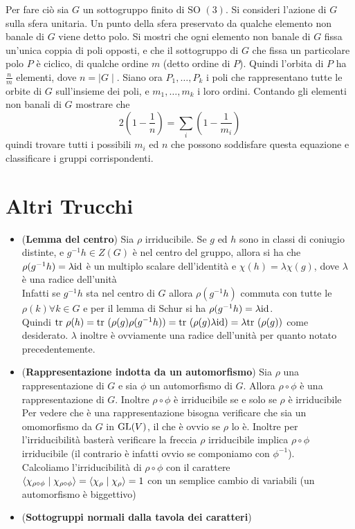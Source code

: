 \documentclass[a4paper,NoNotes,GeneralMath]{stdmdoc}
\newcommand{\SO}{\text{SO }}
\begin{document}
	Per fare ciò sia $G$ un sottogruppo finito di $\SO(3)$. Si consideri l'azione di $G$ sulla sfera unitaria. Un punto della sfera preservato da qualche elemento non banale di $G$ viene detto polo. Si mostri che ogni elemento non banale di $G$ fissa un'unica coppia di poli opposti, e che il sottogruppo di $G$ che fissa un particolare polo $P$ è ciclico, di qualche ordine $m$ (detto ordine di $P$). Quindi l'orbita di $P$ ha $\frac{n}{m}$ elementi, dove $n = \mid G \mid$. Siano ora $P_1, \ldots, P_k$ i poli che rappresentano tutte le orbite di $G$ sull'insieme dei poli, e $m_1, \ldots, m_k$ i loro ordini. Contando gli elementi non banali di $G$ mostrare che $$ 2 \left( 1 - \frac{1}{n} \right) = \sum_i \left( 1 - \frac{1}{m_i} \right) $$ quindi trovare tutti i possibili $m_i$ ed $n$ che possono soddisfare questa equazione e classificare i gruppi corrispondenti.

	\section{Altri Trucchi}
	\begin{itemize}
		\item ({\bf Lemma del centro}) Sia $\rho$ irriducibile. Se $g$ ed $h$ sono in classi di coniugio distinte, e $g^{-1}h \in Z(G)$ è nel centro del gruppo, allora si ha che $\rho(g^{-1}h) = \lambda \mbox{id}$ è un multiplo scalare dell'identità e $\chi(h) = \lambda \chi(g)$, dove $\lambda$ è una radice dell'unità \\
		Infatti se $g^{-1}h$ sta nel centro di $G$ allora $\rho(g^{-1}h)$ commuta con tutte le $\rho(k) \forall k \in G$ e per il lemma di Schur si ha $\rho(g^{-1}h) = \lambda \mbox{id}$. \\
		Quindi $\mbox{tr } \rho(h) = \mbox{tr } ( \rho(g) \rho(g^{-1}h) ) = \mbox{tr } ( \rho(g) \lambda \mbox{id}) = \lambda \mbox{tr }(\rho(g))$ come desiderato.
		$\lambda$ inoltre è ovviamente una radice dell'unità per quanto notato precedentemente.

		\item ({\bf Rappresentazione indotta da un automorfismo}) Sia $\rho$ una rappresentazione di $G$ e sia $\phi$ un automorfismo di $G$. Allora $\rho \circ \phi$ è una rappresentazione di $G$. Inoltre $\rho \circ \phi$ è irriducibile se e solo se $\rho$ è irriducibile \\
		Per vedere che è una rappresentazione bisogna verificare che sia un omomorfismo da $G$ in $\mbox{GL}(V)$, il che è ovvio se $\rho$ lo è. Inoltre per l'irriducibilità basterà verificare la freccia $\rho$ irriducibile implica $\rho \circ \phi$ irriducibile (il contrario è infatti ovvio se componiamo con $\phi^{-1}$). \\
		Calcoliamo l'irriducibilità di $\rho \circ \phi$ con il carattere $\langle \chi_{\rho \circ \phi} \mid \chi_{\rho \circ \phi} \rangle = \langle \chi_\rho \mid \chi_\rho \rangle = 1$ con un semplice cambio di variabili (un automorfismo è biggettivo)

		\item ({\bf Sottogruppi normali dalla tavola dei caratteri})
		
	\end{itemize}
\end{document}
